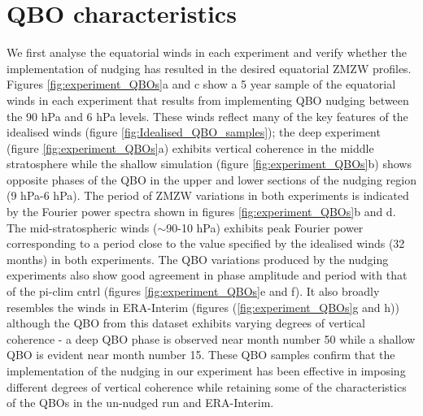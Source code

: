 
\section{QBO characteristics}
We first analyse the equatorial winds in each experiment and verify whether the implementation of nudging has resulted in the desired equatorial ZMZW profiles. Figures \ref{fig:experiment_QBOs}a and c show a 5 year sample of the equatorial winds in each experiment that results from implementing QBO nudging between the 90 hPa and 6 hPa levels. These winds reflect many of the key features of the idealised winds (figure \ref{fig:Idealised_QBO_samples}); the deep experiment (figure \ref{fig:experiment_QBOs}a) exhibits vertical coherence in the middle stratosphere while the shallow simulation (figure \ref{fig:experiment_QBOs}b) shows opposite phases of the QBO in the upper and lower sections of the nudging region (9 hPa-6 hPa). The period of ZMZW variations in both experiments is indicated by the Fourier power spectra shown in figures \ref{fig:experiment_QBOs}b and d. The mid-stratospheric winds ($\sim$90-10 hPa) exhibits peak Fourier power corresponding to a period close to the value specified by the idealised winds (32 months) in both experiments. The QBO variations produced by the nudging experiments also show good agreement in phase amplitude and period with that of the pi-clim cntrl (figures \ref{fig:experiment_QBOs}e and f). It also broadly resembles the winds in ERA-Interim (figures (\ref{fig:experiment_QBOs}g and h)) although the QBO from this dataset exhibits varying degrees of vertical coherence - a deep QBO phase is observed near month number 50 while a shallow QBO is evident near month number 15. These QBO samples confirm that the implementation of the nudging in our experiment has been effective in imposing different degrees of vertical coherence while retaining some of the characteristics of the QBOs in the un-nudged run and ERA-Interim.

